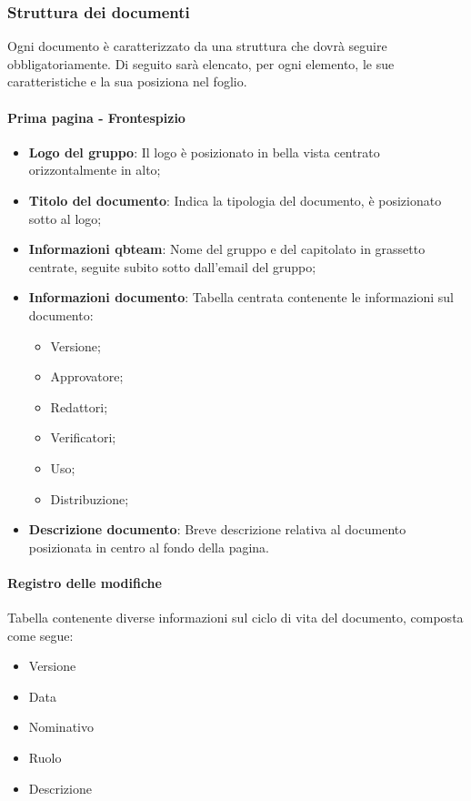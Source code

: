 \subsubsection{Struttura dei documenti}
Ogni documento è caratterizzato da una struttura che dovrà seguire obbligatoriamente.
Di seguito sarà elencato, per ogni elemento, le sue caratteristiche e la sua posiziona nel foglio.

\paragraph{Prima pagina - Frontespizio} 
\begin{itemize}
\item \textbf{Logo del gruppo}: Il logo è posizionato in bella vista centrato orizzontalmente in alto;
\item \textbf{Titolo del documento}: Indica la tipologia del documento, è posizionato sotto al logo;
\item \textbf{Informazioni qbteam}: Nome del gruppo e del capitolato in grassetto centrate, seguite subito sotto dall'email del gruppo; 
\item \textbf{Informazioni documento}: Tabella centrata contenente le informazioni sul documento:
\begin{itemize}
\item Versione;
\item Approvatore;
\item Redattori;
\item Verificatori;
\item Uso;
\item Distribuzione;
\end{itemize}
\item \textbf{Descrizione documento}: Breve descrizione relativa al documento posizionata in centro al fondo della pagina.
\end{itemize}

\paragraph{Registro delle modifiche} 
Tabella contenente diverse informazioni sul ciclo di vita del documento, composta come segue:
\begin{itemize}
\item Versione
\item Data
\item Nominativo
\item Ruolo
\item Descrizione
\end{itemize}

